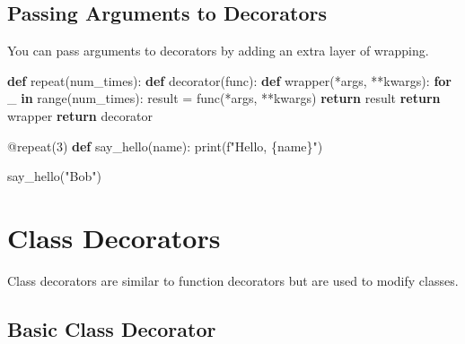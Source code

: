\documentclass[
  letterpaper,
  DIV=11,
  numbers=noendperiod]{scrreprt}
\newenvironment{Shaded}{\begin{snugshade}}{\end{snugshade}}
\newcommand{\AttributeTok}[1]{\textcolor[rgb]{0.40,0.45,0.13}{#1}}
\newcommand{\BuiltInTok}[1]{\textcolor[rgb]{0.00,0.23,0.31}{#1}}
\newcommand{\ControlFlowTok}[1]{\textcolor[rgb]{0.00,0.23,0.31}{\textbf{#1}}}
\newcommand{\DecValTok}[1]{\textcolor[rgb]{0.68,0.00,0.00}{#1}}
\newcommand{\KeywordTok}[1]{\textcolor[rgb]{0.00,0.23,0.31}{\textbf{#1}}}
\newcommand{\NormalTok}[1]{\textcolor[rgb]{0.00,0.23,0.31}{#1}}
\newcommand{\OperatorTok}[1]{\textcolor[rgb]{0.37,0.37,0.37}{#1}}
\newcommand{\SpecialCharTok}[1]{\textcolor[rgb]{0.37,0.37,0.37}{#1}}
\newcommand{\SpecialStringTok}[1]{\textcolor[rgb]{0.13,0.47,0.30}{#1}}
\newcommand{\StringTok}[1]{\textcolor[rgb]{0.13,0.47,0.30}{#1}}
\begin{document}
\subsection{Passing Arguments to
Decorators}\label{passing-arguments-to-decorators}

You can pass arguments to decorators by adding an extra layer of
wrapping.

\begin{Shaded}
\begin{Highlighting}[]
\KeywordTok{def}\NormalTok{ repeat(num\_times):}
    \KeywordTok{def}\NormalTok{ decorator(func):}
        \KeywordTok{def}\NormalTok{ wrapper(}\OperatorTok{*}\NormalTok{args, }\OperatorTok{**}\NormalTok{kwargs):}
            \ControlFlowTok{for}\NormalTok{ \_ }\KeywordTok{in} \BuiltInTok{range}\NormalTok{(num\_times):}
\NormalTok{                result }\OperatorTok{=}\NormalTok{ func(}\OperatorTok{*}\NormalTok{args, }\OperatorTok{**}\NormalTok{kwargs)}
            \ControlFlowTok{return}\NormalTok{ result}
        \ControlFlowTok{return}\NormalTok{ wrapper}
    \ControlFlowTok{return}\NormalTok{ decorator}

\AttributeTok{@repeat}\NormalTok{(}\DecValTok{3}\NormalTok{)}
\KeywordTok{def}\NormalTok{ say\_hello(name):}
    \BuiltInTok{print}\NormalTok{(}\SpecialStringTok{f"Hello, }\SpecialCharTok{\{}\NormalTok{name}\SpecialCharTok{\}}\SpecialStringTok{"}\NormalTok{)}

\NormalTok{say\_hello(}\StringTok{"Bob"}\NormalTok{)}
\end{Highlighting}
\end{Shaded}

\section{Class Decorators}\label{class-decorators}

Class decorators are similar to function decorators but are used to
modify classes.

\subsection{Basic Class Decorator}\label{basic-class-decorator}
\end{document}
